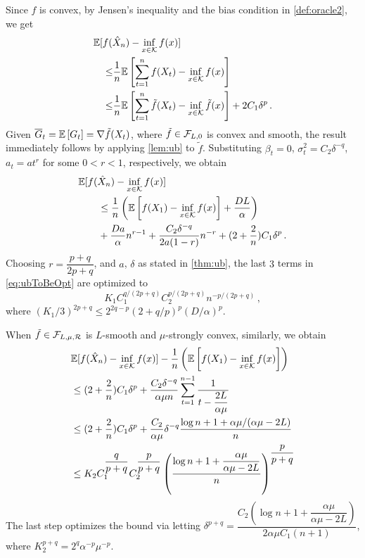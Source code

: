 Since $f$ is convex, by Jensen's inequality and the bias condition in \cref{def:oracle2}, we get
\begin{align*}
\MoveEqLeft
 \E[f(\hat X_n) - \inf_{x \in \cK} f(x)] \\
 \le&  
 \dfrac{1}{n}\EE{ \sum_{t=1}^n f(X_t) - \inf_{x \in \cK}f(x) } \\
 \le &\dfrac{1}{n}\EE{ \sum_{t=1}^n \tilde{f}(X_t) - \inf_{x \in \cK}\tilde{f}(x) } +2C_1 \delta^p
 \,.
\end{align*}
Given $\overline{G}_t=\mathbb{E}\left[G_t\right] = \nabla \tilde{f}(X_t)$, where $\tilde{f}\in \mathcal{F}_{L,0}$ is convex and smooth,
the result immediately follows by applying \cref{lem:ub} to $\tilde{f}$. 
Substituting
 $\beta_t = 0$, $\sigma^2_t = C_2 \delta^{-q}$, $a_t=a t^r$ for some $0<r<1$, respectively, we obtain
 \begin{align}
 \MoveEqLeft
 \E[f(\hat X_n) - \inf_{x \in \cK} f(x)]  \nonumber\\
&\le \dfrac{1}{n}\left(\EE{f(X_1)-\inf_{x \in \cK}f(x)}+\dfrac{DL}{\alpha}  \right)\nonumber\\
&+\dfrac{Da}{\alpha} n^{r-1}+\dfrac{C_2 \delta^{-q}}{2a(1-r)}n^{-r}+ (2+\dfrac{2}{n})C_1\delta^p \,.
\label{eq:ubToBeOpt}
 \end{align}
 Choosing $r = \dfrac{p+q}{2p+q}$, and $a$, $\delta$ as stated in \cref{thm:ub}, the last $3$ terms in \eqref{eq:ubToBeOpt} are optimized to
 \[
 K_1 C_1^{q/(2p+q)} C_2^{p/(2p+q)} n ^{-p/(2p+q)} \,,
 \]
 where 
 $(K_1/3)^{2p+q} \le 2^{2q-p}\left(2+q/p \right)^p \left(D/\alpha\right)^{p}$.
 
 When $\tilde{f}\in \mathcal{F}_{L,\mu, \mathcal{R}}$ is $L$-smooth and $\mu$-strongly convex, similarly, we obtain
 \begin{align*}
& \mathbb{E}[f(\hat X_n) - \inf_{x \in \mathcal{K}} f(x)] -\dfrac{1}{n}\left(\mathbb{E}\left[f(X_1)-\inf_{x \in \mathcal{K}}f(x)\right]\right)\\
&\le (2+\dfrac{2}{n})C_1\delta^p+\dfrac{C_2 \delta^{-q}}{\alpha \mu n} \sum_{t=1}^{n-1}\dfrac{1}{t-\dfrac{2L}{\alpha \mu}}\\
&\le (2+\dfrac{2}{n})C_1\delta^p+\dfrac{C_2 }{\alpha \mu}\delta^{-q} \dfrac{\log n+1+\alpha \mu/(\alpha \mu-2L)}{n}\\
&\le K_2C_1^{\dfrac{q}{p+q}}C_2^{\dfrac{p}{p+q}} \left( \dfrac{\log n+1+\dfrac{\alpha \mu}{\alpha \mu -2L}}{n} \right)^{\dfrac{p}{p+q}}
 \end{align*}
The last step optimizes the bound via letting 
$\delta^{p+q} =  \dfrac{C_2\left( \log n+1+\dfrac{\alpha \mu}{\alpha \mu -2L}\right)}{2\alpha \mu C_1 (n+1)}$, 
where
$K_2^{p+q}=2^{q}\alpha^{-p}\mu^{-p}$.
